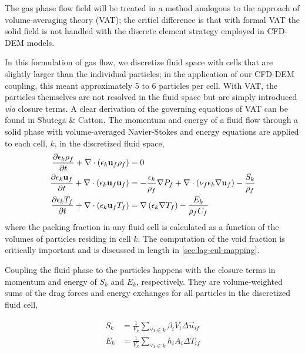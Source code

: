 The gas phase flow field will be treated in a method analogous to the approach of volume-averaging theory (VAT); the criticl difference is that with formal VAT the solid field is not handled with the discrete element strategy employed in CFD-DEM models.\cite{Tsuji1992} 

In this formulation of gas flow, we discretize fluid space with cells that are slightly larger than the individual particles; in the application of our CFD-DEM coupling, this meant approximately 5 to 6 particles per cell. With VAT, the particles themselves are not resolved in the fluid space but are simply introduced \textit{via} closure terms.\cite{Sbutega2013,Horvat2006} A clear derivation of the governing equations of VAT can be found in Sbutega \& Catton\cite{Sbutega2013}. The momentum and energy of a fluid flow through a solid phase with volume-averaged Navier-Stokes and energy equations are applied to each cell, $k$, in the discretized fluid space,
\begin{subequations}\label{eq:cfd-equations}
\begin{align}
\pder[\epsilon_k \rho_f]{t} + \nabla\cdot(\epsilon_k \vec{u}_f \rho_f) &= 0\\
\pder[\epsilon_k \vec{u}_f]{t} + \nabla\cdot(\epsilon_k \vec{u}_f \vec{u}_f) &= -\frac{\epsilon_k}{\rho_f}\nabla P_f + \nabla\cdot\left(\nu_f\epsilon_k\nabla \vec{u}_f\right) - \frac{S_k}{\rho_f}\\
\pder[\epsilon_k T_f]{t} + \nabla\cdot(\epsilon_k \vec{u}_f T_f) &= \nabla\left(\epsilon_k\nabla T_f\right)-\frac{E_k}{\rho_fC_f}
\end{align}
\end{subequations}
where the packing fraction in any fluid cell is calculated as a function of the volumes of particles residing in cell $k$. The computation of the void fraction is critically important and is discussed in length in \cref{sec:lag-eul-mapping}.

Coupling the fluid phase to the particles happens with the closure terms in momentum and energy of $S_k$ and $E_k$, respectively. They are volume-weighted sums of the drag forces and energy exchanges for all particles in the discretized fluid cell,

\begin{subequations}\label{eq:cfd-sources}
\begin{align}
	S_k &= \frac{1}{V_k}\sum_{\forall i \in k} \beta_i V_i \Delta \vec{u}_{if} \label{eq:cfd-mom-source}\\
	E_k &= \frac{1}{V_k}\sum_{\forall i \in k} h_i A_i \Delta T_{if}
\end{align}
\end{subequations}

